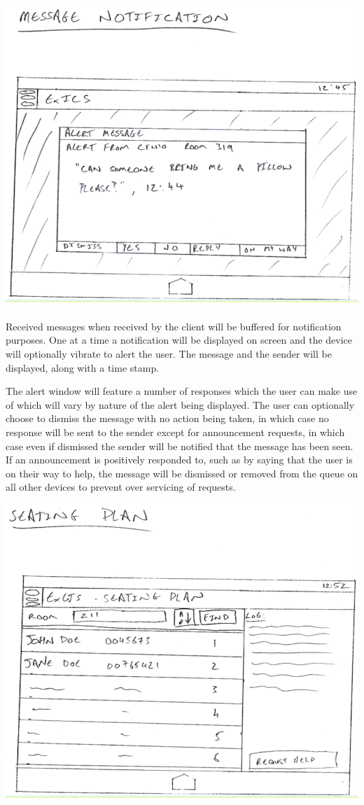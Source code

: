 \includegraphics[width=\textwidth]{"GUI Sketches/Message Notification Cropped"}

Received messages when received by the client will be buffered for notification purposes.  One at a time a notification will be displayed on screen and the device will optionally vibrate to alert the user.  The message and the sender will be displayed, along with a time stamp.

The alert window will feature a number of responses which the user can make use of which will vary by nature of the alert being displayed.  The user can optionally choose to dismiss the message with no action being taken, in which case no response will be sent to the sender except for announcement requests, in which case even if dismissed the sender will be notified that the message has been seen.  If an announcement is positively responded to, such as by saying that the user is on their way to help, the message will be dismissed or removed from the queue on all other devices to prevent over servicing of requests.

\includegraphics[width=\textwidth]{"GUI Sketches/Seating Plan Cropped"}

